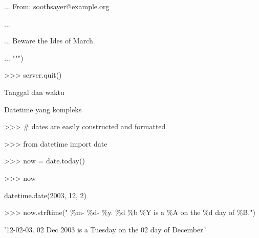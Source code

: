 \documentclass[a4paper,12pt]{report}
\begin{document}
\noindent 
{\fontsize{14pt}{14pt}\selectfont ... From: soothsayer@example.org \\} \par
\noindent 
{\fontsize{14pt}{14pt}\selectfont ... \\} \par
\noindent 
{\fontsize{14pt}{14pt}\selectfont ... Beware the Ides of March. \\} \par
\noindent 
{\fontsize{14pt}{14pt}\selectfont ... """) \\} \par
\noindent 
{\fontsize{14pt}{14pt}\selectfont >>> server.quit() \\} \par
\vspace{14pt}
\noindent 
{\fontsize{14pt}{14pt}\selectfont Tanggal dan waktu \\} \par
\noindent 
{\fontsize{14pt}{14pt}\selectfont Datetime yang kompleks \\} \par
\vspace{14pt}
\noindent 
{\fontsize{14pt}{14pt}\selectfont >>>  $  \#  $ dates are easily constructed and formatted \\} \par
\vspace{14pt}
\noindent 
{\fontsize{14pt}{14pt}\selectfont >>> from datetime import date \\} \par
\noindent 
{\fontsize{14pt}{14pt}\selectfont >>> now = date.today() \\} \par
\vspace{14pt}
\noindent 
{\fontsize{14pt}{14pt}\selectfont >>> now \\} \par
\noindent 
{\fontsize{14pt}{14pt}\selectfont datetime.date(2003, 12, 2) \\} \par
\vspace{14pt}
\noindent 
{\fontsize{14pt}{14pt}\selectfont >>> now.strftime(" $  \%  $m- $  \%  $d- $  \%  $y.  $  \%  $d  $  \%  $b  $  \%  $Y is a  $  \%  $A on the  $  \%  $d day of  $  \%  $B.") \\} \par
\noindent 
{\fontsize{14pt}{14pt}\selectfont '12-02-03. 02 Dec 2003 is a Tuesday on the 02 day of December.' \\} \par
\end{document}
